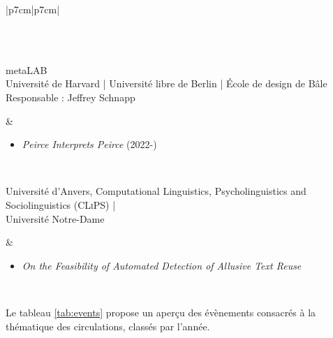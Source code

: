 \begin{table}[htbp]
{\begin{tabular}[t]{|p{7cm}|p{7cm}|}
\begin{minipage}[t]{\linewidth}
\begin{itemize}[leftmargin=*]
				\end{itemize}
			\end{minipage} \\ \hline\hline
								\\ \hline
						\begin{minipage}[t]{\linewidth}
				meta\textsc{LAB}\\
				Université de Harvard | Université libre de Berlin | École de design de Bâle\\
				Responsable : Jeffrey Schnapp
			\end{minipage} 
			& 
			\begin{minipage}[t]{\linewidth}
				\begin{itemize}[leftmargin=*]
					\item \textit{Peirce Interprets Peirce} (2022-)
				\end{itemize}
			\end{minipage} \\ \hline
			\begin{minipage}[t]{\linewidth}
			Université d'Anvers, Computational Linguistics, Psycholinguistics and Sociolinguistics (\textsc{CLiPS}) |\\Université Notre-Dame
			\end{minipage} 
			& 
			\begin{minipage}[t]{\linewidth}
				\begin{itemize}[leftmargin=*]
					\item \textit{On the Feasibility of Automated Detection of Allusive Text Reuse} \citep{manjavacas}
				\end{itemize}
			\end{minipage} \\ \hline
		\end{tabular}%
	}
	\caption{Structures de recherche axées sur la thématique des circulations des savoirs.}
	\label{tab:equipes}
\end{table}



Le tableau \ref{tab:events} propose un aperçu des évènements consacrés à la thématique des circulations, classés par l'année. 


